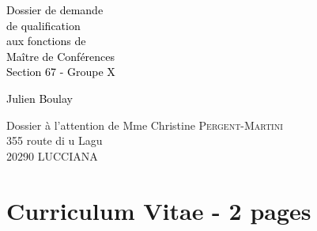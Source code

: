 \documentclass[a4paper,11pt,fleqn]{book} %
\begin{document}

\begingroup
\thispagestyle{empty}
\centering
\vspace*{5cm}
\par\normalfont\fontsize{35}{35}\sffamily\selectfont
\textcolor{black}{Dossier de demande \\de qualification \\aux fonctions de \\Maître de Conférences}\\
\textcolor{black}{\LARGE Section 67 - Groupe X}\par %
\vspace*{1cm}
\textcolor{black}{\Huge Julien Boulay}\par %
\endgroup

\clearpage

\begin{flushright}
Dossier à l'attention de Mme Christine \textsc{Pergent-Martini}\\ 355 route di u Lagu\\ 20290 LUCCIANA
\end{flushright}


\pagestyle{empty} %


\tableofcontents %


\pagestyle{fancy} %


\chapter{Curriculum Vitae - 2 pages}

\end{document}
